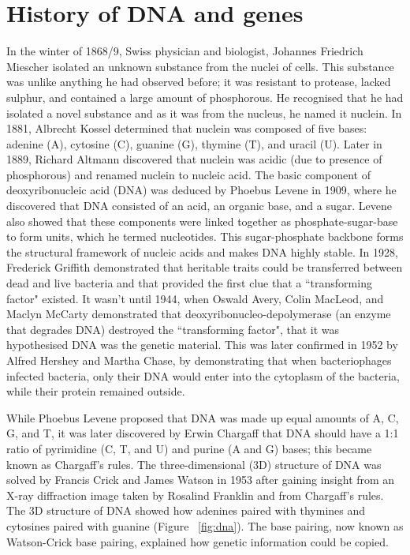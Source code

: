 \section{History of DNA and genes}

In the winter of 1868/9, Swiss physician and biologist, Johannes Friedrich Miescher isolated an unknown substance from the nuclei of cells\cite{dahm2008discovering}. This substance was unlike anything he had observed before; it was resistant to protease, lacked sulphur, and contained a large amount of phosphorous. He recognised that he had isolated a novel substance and as it was from the nucleus, he named it nuclein. In 1881, Albrecht Kossel determined that nuclein was composed of five bases: adenine (A), cytosine (C), guanine (G), thymine (T), and uracil (U). Later in 1889, Richard Altmann discovered that nuclein was acidic (due to presence of phosphorous) and renamed nuclein to nucleic acid. The basic component of deoxyribonucleic acid (DNA) was deduced by Phoebus Levene in 1909, where he discovered that DNA consisted of an acid, an organic base, and a sugar. Levene also showed that these components were linked together as phosphate-sugar-base to form units, which he termed nucleotides. This sugar-phosphate backbone forms the structural framework of nucleic acids and makes DNA highly stable. In 1928, Frederick Griffith demonstrated that heritable traits could be transferred between dead and live bacteria and that provided the first clue that a ``transforming factor" existed\cite{griffith1928significance}. It wasn't until 1944, when Oswald Avery, Colin MacLeod, and Maclyn McCarty demonstrated that deoxyribonucleo-depolymerase (an enzyme that degrades DNA) destroyed the ``transforming factor", that it was hypothesised DNA was the genetic material\cite{avery1944studies}. This was later confirmed in 1952 by Alfred Hershey and Martha Chase, by demonstrating that when bacteriophages infected bacteria, only their DNA would enter into the cytoplasm of the bacteria, while their protein remained outside\cite{hershey1952independent}.

While Phoebus Levene proposed that DNA was made up equal amounts of A, C, G, and T, it was later discovered by Erwin Chargaff that DNA should have a 1:1 ratio of pyrimidine (C, T, and U) and purine (A and G) bases\cite{pmid14938364, pmid14945441}; this became known as Chargaff's rules. The three-dimensional (3D) structure of DNA was solved by Francis Crick and James Watson in 1953\cite{WATSON_1953} after gaining insight from an X-ray diffraction image taken by Rosalind Franklin and from Chargaff's rules. The 3D structure of DNA showed how adenines paired with thymines and cytosines paired with guanine (Figure ~\ref{fig:dna}). The base pairing, now known as Watson-Crick base pairing, explained how genetic information could be copied.

